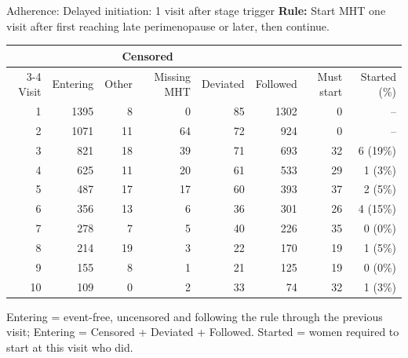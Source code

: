 \begin{frame}{Adherence: Delayed initiation: 1 visit after stage trigger}
\centering
{\small \textbf{Rule:} Start MHT one visit after first reaching late perimenopause or later, then continue.}\par\vspace{6pt}
{\scriptsize
\begin{tabular}{r r r r r r r r}
\toprule
 & & \multicolumn{2}{c}{Censored} & & & & \\
\cmidrule(lr){3-4}
Visit & Entering & Other & Missing MHT & Deviated & Followed & Must start & Started (\%) \\
\midrule
1 & 1395 & 8 & 0 & 85 & 1302 & 0 & -- \\
2 & 1071 & 11 & 64 & 72 & 924 & 0 & -- \\
3 & 821 & 18 & 39 & 71 & 693 & 32 & 6 (19\%) \\
4 & 625 & 11 & 20 & 61 & 533 & 29 & 1 (3\%) \\
5 & 487 & 17 & 17 & 60 & 393 & 37 & 2 (5\%) \\
6 & 356 & 13 & 6 & 36 & 301 & 26 & 4 (15\%) \\
7 & 278 & 7 & 5 & 40 & 226 & 35 & 0 (0\%) \\
8 & 214 & 19 & 3 & 22 & 170 & 19 & 1 (5\%) \\
9 & 155 & 8 & 1 & 21 & 125 & 19 & 0 (0\%) \\
10 & 109 & 0 & 2 & 33 & 74 & 32 & 1 (3\%) \\
\bottomrule
\end{tabular}}
\par\vspace{6pt}
{\tiny Entering = event-free, uncensored and following the rule through the previous visit; Entering = Censored + Deviated + Followed. Started = women required to start at this visit who did.}
\end{frame}

